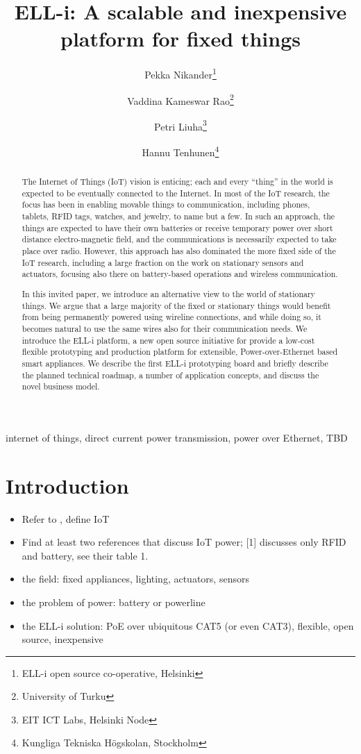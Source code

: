 \documentclass[draft,a4paper]{siamltex}
\title{{ELL-i}: A scalable and inexpensive platform for fixed things}
\author{Pekka Nikander\thanks{ELL-i open source co-operative, Helsinki}
  \and Vaddina Kameswar Rao\thanks{University of Turku}
  \and Petri Liuha\thanks{EIT ICT Labs, Helsinki Node}
  \and Hannu Tenhunen\thanks{Kungliga Tekniska H\"{o}gskolan, Stockholm}}
\begin{document}
\maketitle

\begin{abstract}
The Internet of Things (IoT) vision is enticing; each and every
``thing'' in the world is expected to be eventually connected to the
Internet.  In most of the IoT research, the focus has been in enabling
movable things to communication, including phones, tablets, RFID tags,
watches, and jewelry, to name but a few.  In such an approach, the
things are expected to have their own batteries or receive temporary
power over short distance electro-magnetic field, and the
communications is necessarily expected to take place over radio.
However, this approach has also dominated the more fixed side of the
IoT research, including a large fraction on the work on stationary
sensors and actuators, focusing also there on battery-based operations
and wireless communication. 

In this invited paper, we introduce an alternative view to the world
of stationary things.  We argue that a large majority of the fixed or
stationary things would benefit from being permanently powered using
wireline connections, and while doing so, it becomes natural to use
the same wires also for their communication needs.  We introduce the
ELL-i platform, a new open source initiative for provide a low-cost
flexible prototyping and production platform for extensible,
Power-over-Ethernet based smart appliances.  We describe the first
ELL-i prototyping board and briefly describe the planned technical
roadmap, a number of application concepts, and discuss the novel
business model. 
\end{abstract}

\begin{keywords} 
internet of things, direct current power transmission, power over
Ethernet, TBD
\end{keywords}

\pagestyle{myheadings}
\thispagestyle{plain}


\section{Introduction}

\begin{itemize}
  \item Refer to \cite{Atzori20102787}, define IoT
  \item Find at least two references that discuss IoT power; [1]
    discusses only RFID and battery, see their table 1. 
  \item the field: fixed appliances, lighting, actuators, sensors
  \item the problem of power: battery or powerline
  \item the ELL-i solution: PoE over ubiquitous CAT5 (or even CAT3),
    flexible, open source, inexpensive 
\end{itemize}
\end{document}
